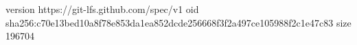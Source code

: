 version https://git-lfs.github.com/spec/v1
oid sha256:c70e13bed10a8f78e853da1ea852dcde256668f3f2a497ce105988f2c1e47c83
size 196704
